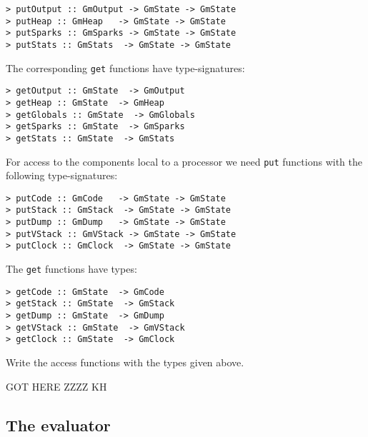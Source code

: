 \begin{verbatim}
> putOutput :: GmOutput -> GmState -> GmState
> putHeap :: GmHeap   -> GmState -> GmState
> putSparks :: GmSparks -> GmState -> GmState
> putStats :: GmStats  -> GmState -> GmState
\end{verbatim}
%
%
%
%
\par
The corresponding \mbox{\tt get} functions have type-signatures:

\begin{verbatim}
> getOutput :: GmState  -> GmOutput
> getHeap :: GmState  -> GmHeap
> getGlobals :: GmState  -> GmGlobals
> getSparks :: GmState  -> GmSparks
> getStats :: GmState  -> GmStats
\end{verbatim}
%
%
%
%
%
\par
For access to the components local to a processor we need \mbox{\tt put} functions
with the following type-signatures:

\begin{verbatim}
> putCode :: GmCode   -> GmState -> GmState
> putStack :: GmStack  -> GmState -> GmState
> putDump :: GmDump   -> GmState -> GmState
> putVStack :: GmVStack -> GmState -> GmState
> putClock :: GmClock  -> GmState -> GmState
\end{verbatim}
%
%
%
%
%
\par
The \mbox{\tt get} functions have types:

\begin{verbatim}
> getCode :: GmState  -> GmCode
> getStack :: GmState  -> GmStack
> getDump :: GmState  -> GmDump
> getVStack :: GmState  -> GmVStack
> getClock :: GmState  -> GmClock
\end{verbatim}
%
%
%
%
%
\begin{exercise}\label{pgm:X:access}
Write the access functions with the types given above.
\end{exercise}

GOT HERE ZZZZ KH

\par\subsection{The evaluator}

